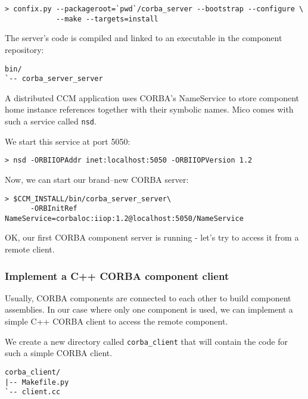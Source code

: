 \begin{small}
\begin{verbatim}
> confix.py --packageroot=`pwd`/corba_server --bootstrap --configure \
            --make --targets=install
\end{verbatim}
\end{small}


The server's code is compiled and linked to an executable in the
component repository:
\begin{small}
\begin{verbatim}
bin/
`-- corba_server_server
\end{verbatim}
\end{small}

A distributed CCM application uses CORBA's NameService to store
component home instance references together with their symbolic names. 
Mico comes with such a service called {\tt nsd}.

We start this service at port 5050:
\begin{small}
\begin{verbatim}
> nsd -ORBIIOPAddr inet:localhost:5050 -ORBIIOPVersion 1.2
\end{verbatim}
\end{small}

Now, we can start our brand--new CORBA server:
\begin{small}
\begin{verbatim}
> $CCM_INSTALL/bin/corba_server_server\
      -ORBInitRef NameService=corbaloc:iiop:1.2@localhost:5050/NameService
\end{verbatim}
\end{small}

OK, our first CORBA component server is running - let's try to access it from
a remote client.


\newpage
\subsubsection{Implement a C++ CORBA component client}

Usually, CORBA components are connected to each other to build component 
assemblies.
In our case where only one component is used, we can implement a simple 
C++ CORBA client to access the remote component.

We create a new directory called {\tt corba\_client} that will
contain the code for such a simple CORBA client.
\begin{small}
\begin{verbatim}
corba_client/
|-- Makefile.py
`-- client.cc
\end{verbatim}
\end{small}

